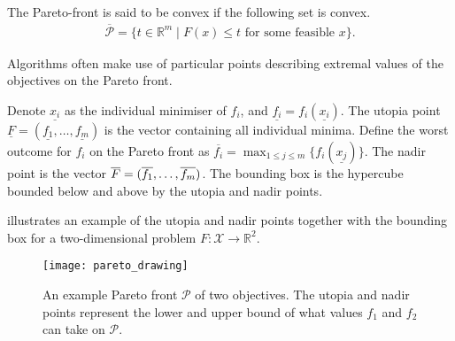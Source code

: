 \documentclass[main.tex]{subfiles}
\begin{document}
\begin{mydef}[Convexity]
  The Pareto-front is said to be convex if the following set is convex.
  \begin{align}
    \overline{\mathcal{P}} = \{t\in\mathbb{R}^m\mid F(x)\leq t \text{ for
    some feasible } x\}.
  \end{align}
\end{mydef}

Algorithms often make use of particular points describing extremal
values of the objectives on the Pareto front.
\begin{mydef}
  Denote $\underline{x_i}$ as the individual minimiser of $f_i$, and
  $\underline{f_i}=f_i(\underline {x_i})$.
  The utopia point $\underline
  F=(\underline{f_1},\dots,\underline{f_m})$
  is the vector containing all individual minima.
  Define the worst outcome for $f_i$ on the Pareto front as
  $\overline{f_i}=\max_{1\leq j\leq m}\{f_i(\underline{x_j})\}$.
  The nadir point is the vector $\overline F =\nobreak
  (\overline{f_1}, \dots, \overline{f_m})$.
  The bounding box is the hypercube bounded below and above by the
  utopia and nadir points.
\end{mydef}

\begin{example}
   illustrates an example of the utopia and nadir
  points together with the bounding box for a two-dimensional problem $F:\mathcal{X}\to\mathbb{R}^2$.
  \begin{figure}[htbp]
    \centering
    \texttt{[image: pareto\_drawing]}
    \caption{An example Pareto front $\mathcal{P}$ of two objectives. The utopia and
      nadir points represent the lower and upper bound of what values
      $f_1$ and $f_2$ can take on $\mathcal{P}$.}\label{fig:pareto_drawing}
  \end{figure}
\end{example}
\end{document}
